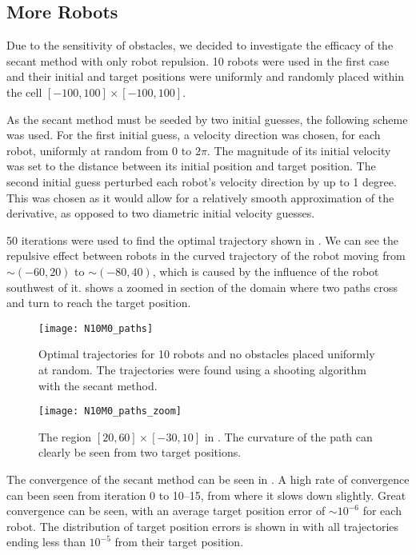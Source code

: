 \documentclass[11pt]{article}
\begin{document}
\subsection{More Robots}

Due to the sensitivity of obstacles, we decided to investigate the efficacy of the secant method with only robot repulsion. 10 robots were used in the first case and their initial and target positions were uniformly and randomly placed within the cell \([-100,100] \times [-100,100]\).

As the secant method must be seeded by two initial guesses, the following scheme was used. For the first initial guess, a velocity direction was chosen, for each robot, uniformly at random from \(0\) to \(2\pi\). The magnitude of its initial velocity was set to the distance between its initial position and target position. The second initial guess perturbed each robot's velocity direction by up to 1 degree. This was chosen as it would allow for a relatively smooth approximation of the derivative, as opposed to two diametric initial velocity guesses.

50 iterations were used to find the optimal trajectory shown in . We can see the repulsive effect between robots in the curved trajectory of the robot moving from \(\sim(-60,20)\) to \(\sim(-80,40)\), which is caused by the influence of the robot southwest of it.  shows a zoomed in section of the domain where two paths cross and turn to reach the target position.

\begin{figure}
	\centering
	\texttt{[image: N10M0\_paths]}
	\caption{Optimal trajectories for 10 robots and no obstacles placed uniformly at random. The trajectories were found using a shooting algorithm with the secant method.}
	\label{fig:n10m0-paths}
\end{figure}

\begin{figure}
	\centering
	\texttt{[image: N10M0\_paths\_zoom]}
	\caption{The region \([20,60] \times [-30,10]\) in . The curvature of the path can clearly be seen from two target positions.}
	\label{fig:n10m0-paths-zoom}
\end{figure}

The convergence of the secant method can be seen in . A high rate of convergence can been seen from iteration 0 to 10--15, from where it slows down slightly. Great convergence can be seen, with an average target position error of \(\sim 10^{-6}\) for each robot. The distribution of target position errors is shown in  with all trajectories ending less than \(10^{-5}\) from their target position.
\end{document}
